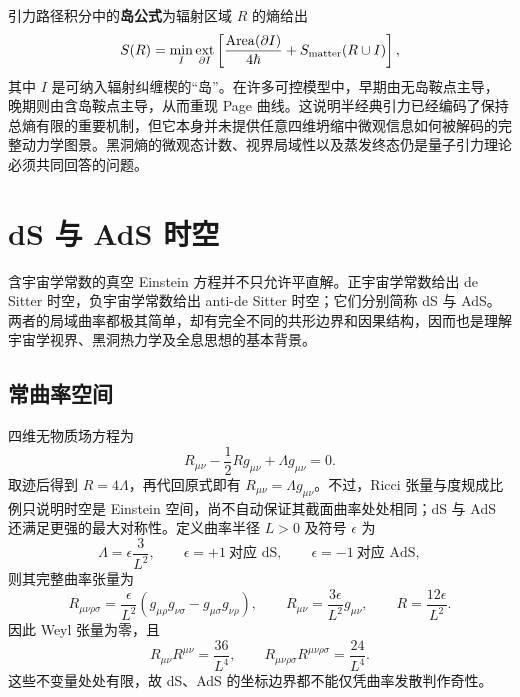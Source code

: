 引力路径积分中的\textbf{岛公式}为辐射区域 $R$ 的熵给出
\begin{equation}\label{eq:island-formula}
    S(R)=\min_I\underset{\partial I}{\operatorname{ext}}
    \left[\frac{\operatorname{Area}(\partial I)}{4\hbar}
      +S_{\rm matter}(R\cup I)\right],
\end{equation}
其中 $I$ 是可纳入辐射纠缠楔的“岛”。在许多可控模型中，早期由无岛鞍点主导，晚期则由含岛鞍点主导，从而重现 Page 曲线。这说明半经典引力已经编码了保持总熵有限的重要机制，但它本身并未提供任意四维坍缩中微观信息如何被解码的完整动力学图景。黑洞熵的微观态计数、视界局域性以及蒸发终态仍是量子引力理论必须共同回答的问题。


\section{dS 与 AdS 时空}\label{sec:dS}

含宇宙学常数的真空 Einstein 方程并不只允许平直解。正宇宙学常数给出 de Sitter 时空，负宇宙学常数给出 anti-de Sitter 时空；它们分别简称 dS 与 AdS。两者的局域曲率都极其简单，却有完全不同的共形边界和因果结构，因而也是理解宇宙学视界、黑洞热力学及全息思想的基本背景。

\subsection{常曲率空间}

四维无物质场方程为
\begin{equation}\label{eq:einstein-lambda-vacuum}
    R_{\mu\nu}-\frac12 R g_{\mu\nu}+\Lambda g_{\mu\nu}=0.
\end{equation}
取迹后得到 $R=4\Lambda$，再代回原式即有 $R_{\mu\nu}=\Lambda g_{\mu\nu}$。不过，Ricci 张量与度规成比例只说明时空是 Einstein 空间，尚不自动保证其截面曲率处处相同；dS 与 AdS 还满足更强的最大对称性。定义曲率半径 $L>0$ 及符号 $\epsilon$ 为
\[
    \Lambda=\epsilon\frac{3}{L^2},\qquad
    \epsilon=+1\ \text{对应 dS},\qquad
    \epsilon=-1\ \text{对应 AdS},
\]
则其完整曲率张量为
\begin{equation}\label{eq:maximally-symmetric-curvature}
    R_{\mu\nu\rho\sigma}
      =\frac{\epsilon}{L^2}
       \left(g_{\mu\rho}g_{\nu\sigma}-g_{\mu\sigma}g_{\nu\rho}\right),
    \qquad
    R_{\mu\nu}=\frac{3\epsilon}{L^2}g_{\mu\nu},
    \qquad
    R=\frac{12\epsilon}{L^2}.
\end{equation}
因此 Weyl 张量为零，且
\[
    R_{\mu\nu}R^{\mu\nu}=\frac{36}{L^4},\qquad
    R_{\mu\nu\rho\sigma}R^{\mu\nu\rho\sigma}=\frac{24}{L^4}.
\]
这些不变量处处有限，故 dS、AdS 的坐标边界都不能仅凭曲率发散判作奇性。

